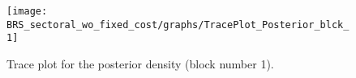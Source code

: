 \begin{figure}[H]
\centering
  \texttt{[image: BRS\_sectoral\_wo\_fixed\_cost/graphs/TracePlot\_Posterior\_blck\_1]}\\
    \caption{Trace plot for the posterior density (block number 1).}
\end{figure}
